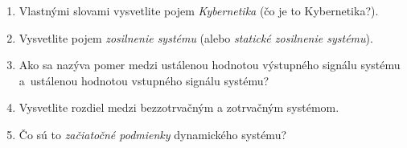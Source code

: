 \documentclass[a4paper, 10pt, ]{article}
\begin{document}
\begin{enumerate}[leftmargin=0pt, labelsep=3mm, itemsep=0pt]

    \item Vlastnými slovami vysvetlite pojem \emph{Kybernetika} (čo je to Kybernetika?).    

	\item Vysvetlite pojem \emph{zosilnenie systému} (alebo \emph{statické zosilnenie systému}).

    \item Ako sa nazýva pomer medzi ustálenou hodnotou výstupného signálu systému a~ustálenou hodnotou vstupného signálu systému? 
    	
    \item Vysvetlite rozdiel medzi bezzotrvačným a zotrvačným systémom.
   
    
    \item Čo sú to \emph{začiatočné podmienky} dynamického systému?
    


\end{enumerate}






\printbibliography[title={Literatúra}]
\end{document}
